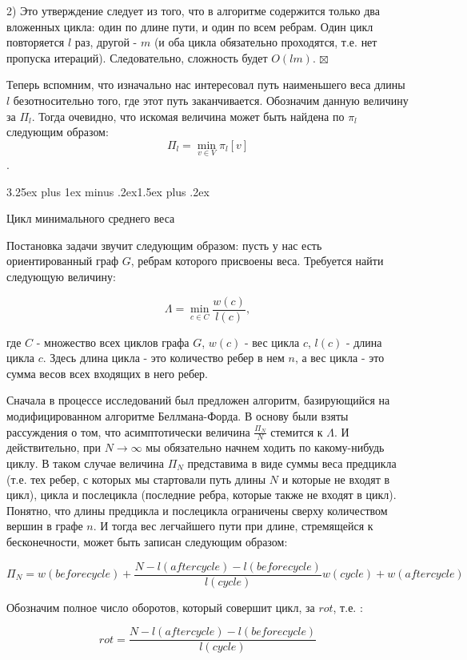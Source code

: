 \documentclass[a4paper,12pt]{report}
\makeatletter
\theoremstyle{plain} %
\theoremstyle{definition}
\theoremstyle{remark}
\renewcommand{\subsection}{\@startsection{subsection}{2}{18pt}%
{3.25ex plus 1ex minus .2ex}{1.5ex plus .2ex}%
{\normalfont\large\bfseries\raggedright}}%
\makeatother
\begin{document}
\begin{large}
2) Это утверждение следует из того, что в алгоритме содержится только два вложенных цикла: один по длине пути, и один по всем ребрам. Один цикл повторяется $l$ раз, другой - $m$ (и оба цикла обязательно проходятся, т.е. нет пропуска итераций). Следовательно, сложность будет $O(lm)$.
$\boxtimes$

\bigskip

Теперь вспомним, что изначально нас интересовал путь наименьшего веса длины $l$ безотносительно того, где этот путь заканчивается. Обозначим данную величину за $\Pi_l$. Тогда очевидно, что искомая величина может быть найдена по $\pi_l$ следующим образом: $$\Pi_l = \min_{v \in V} \pi_l[v]$$.

\subsection{Цикл минимального среднего веса}

Постановка задачи звучит следующим образом: пусть у нас есть ориентированный граф $G$, ребрам которого присвоены веса. Требуется найти следующую величину:

$$\Lambda = \min _{c \in C} \frac{w(c)}{l(c)},$$

где $C$ - множество всех циклов графа $G$, $w(c)$ - вес цикла $c$, $l(c)$ - длина цикла $c$. Здесь длина цикла - это количество ребер в нем $n$, а вес цикла - это сумма весов всех входящих в него ребер.

Сначала в процессе исследований был предложен алгоритм, базирующийся на модифицированном алгоритме Беллмана-Форда. В основу были взяты рассуждения о том, что асимптотически величина $\frac{\Pi_N}{N}$ стемится к $\Lambda$.  И действительно, при $N \rightarrow \infty$ мы обязательно начнем ходить по какому-нибудь циклу. В таком случае величина $\Pi_N$ представима в виде суммы веса предцикла (т.е. тех ребер, с которых мы стартовали путь длины $N$ и которые не входят в цикл), цикла и послецикла (последние ребра, которые также не входят в цикл). Понятно, что длины предцикла и послецикла ограничены сверху количеством вершин в графе $n$. И тогда вес легчайшего пути при длине, стремящейся к бесконечности, может быть записан следующим образом:

$$\Pi_N = w(beforecycle) + \frac{N - l(aftercycle) - l(beforecycle)}{l(cycle)}w(cycle) + w(aftercycle)$$

Обозначим полное число оборотов, который совершит цикл, за $rot$, т.е. :

$$rot =  \frac{N - l(aftercycle) - l(beforecycle)}{l(cycle)}$$


\end{large}
\end{document}
